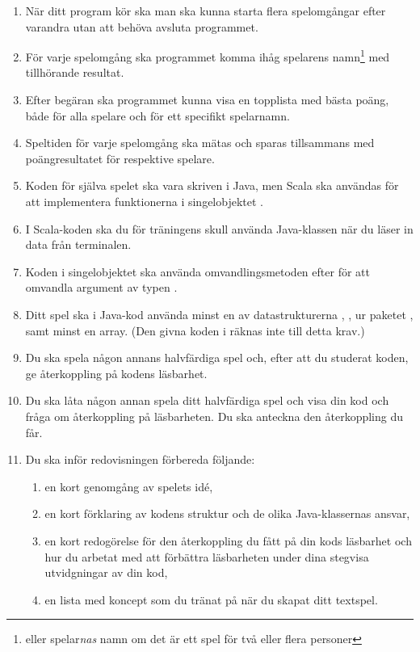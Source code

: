 \begin{enumerate}
  \item När ditt program kör ska man ska kunna starta flera spelomgångar efter varandra utan att behöva avsluta programmet.
  \item För varje spelomgång ska programmet komma ihåg spelarens namn\footnote{eller spelar\emph{nas} namn om det är ett spel för två eller flera personer} med tillhörande resultat.
  \item Efter begäran ska programmet kunna visa en topplista med bästa poäng, både för alla spelare och för ett specifikt spelarnamn.
  \item Speltiden för varje spelomgång ska mätas och sparas tillsammans med poängresultatet för respektive spelare.
  \item Koden för själva spelet ska vara skriven i Java, men Scala ska användas för att implementera funktionerna i singelobjektet .
  \item I Scala-koden ska du för träningens skull använda Java-klassen  när du läser in data från terminalen.
  \item Koden i singelobjektet  ska använda omvandlingsmetoden  efter  för att omvandla argument av typen .
  \item Ditt spel ska i Java-kod använda minst en av datastrukturerna
  ,
  ,
   ur paketet , samt minst en array. (Den givna koden i  räknas inte till detta krav.)
  \item Du ska spela någon annans halvfärdiga spel och, efter att du studerat koden, ge återkoppling på kodens läsbarhet.
  \item Du ska låta någon annan spela ditt halvfärdiga spel och visa din kod och fråga om återkoppling på läsbarheten. Du ska anteckna den återkoppling du får.
  \item Du ska inför redovisningen förbereda följande:
  \begin{enumerate}
    \item en kort genomgång av spelets idé,
    \item en kort förklaring av kodens struktur och de olika Java-klassernas ansvar,
    \item en kort redogörelse för den återkoppling du fått på din kods läsbarhet och hur du arbetat med att förbättra läsbarheten under dina stegvisa utvidgningar av din kod,
    \item en lista med koncept som du tränat på när du skapat ditt textspel.
  \end{enumerate}
\end{enumerate}

